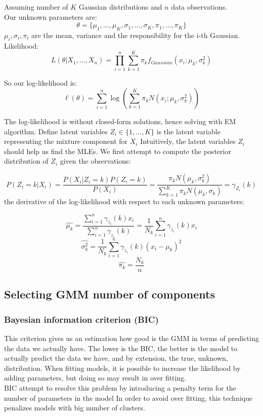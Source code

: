 \documentclass[20pt,a4paper]{article}
\begin{document}
    Assuming number of \(K\) Gaussian distributions and \(n\) data
observations.\\
Our unknown parameters are:
$$\theta = \{\mu_1,\ldots,\mu_K,\sigma_1,\ldots,\sigma_K,\pi_1,\ldots,\pi_K\}$$
$\mu_i, \sigma_i, \pi_i$ are the mean, variance and the responsibility for the i-th Gaussian.\\

Likelihood:
$$L(\theta | X_1,\ldots,X_n) = \prod_{i=1}^n \sum_{k=1}^K \pi_k f_{Gaussian}(x_i;\mu_k, \sigma_k^2)$$

So our log-likelihood is:\\
$$\ell(\theta) = \sum_{i=1}^n \log \left( \sum_{k=1}^K \pi_k N(x_i;\mu_k, \sigma_k^2) \right )$$

The log-likelihood is without closed-form solutions, hence solving with EM algorithm.
Define latent variables $Z_i \in \{1,\ldots,K\}$ is the latent variable representing the mixture component for $X_i$ Intuitively, the latent variables $Z_i$ should help us find the MLEs. We first attempt to compute the posterior distribution of $Z_i$ given
the observations:

$$P(Z_i=k|X_i) = \frac{P(X_i|Z_i=k)P(Z_i=k)}{P(X_i)} = \frac{\pi_k N(\mu_k,\sigma_k^2)}{\sum_{k=1}^K\pi_k N(\mu_k, \sigma_k)} = \gamma_{Z_i}(k) $$
the derivative of the log-likelihood with respect to each unknown parameters: \\
\begin{center}
    \begin{equation}
        \hat{\mu_k} = \frac{\sum_{i=1}^n \gamma_{z_i}(k)x_i}{\sum_{i=1}^n \gamma_{z_i}(k)} = \frac{1}{N_k} \sum_{i=1}^n \gamma_{z_i}(k)x_i
    \end{equation}
   \begin{equation}
        \hat{\sigma_k^2} = \frac{1}{N_k}\sum_{i=1}^n \gamma_{z_i}(k) (x_i - \mu_k)^2
    \end{equation}
    \begin{equation}
        \hat{\pi_k} = \frac{N_k}{n}
    \end{equation}
\end{center}

\subsection{Selecting GMM number of components}

\subsubsection{Bayesian information criterion (BIC)}
This criterion gives us an estimation how good is the GMM in terms of
predicting the data we actually have.
The lower is the BIC, the better is the model to actually predict the
data we have, and by extension, the true, unknown, distribution. When
fitting models, it is possible to increase the likelihood by adding
parameters, but doing so may result in over fitting.\\
BIC attempt to resolve this problem by introducing a penalty term for
the number of parameters in the model In order to avoid over fitting,
this technique penalizes models with big number of clusters.
\end{document}

